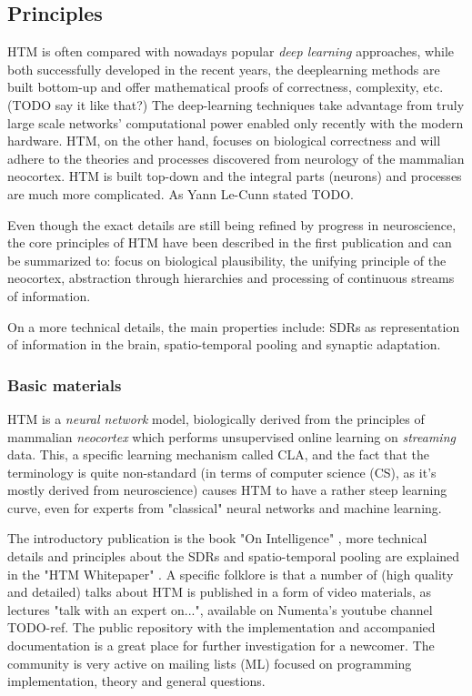 \documentclass[a4,IEEEconf]{article}
\begin{document}
\subsection{Principles}
HTM is often compared with nowadays popular \textit{deep learning} approaches, while both successfully developed in the recent years, the deeplearning methods are built bottom-up and offer mathematical proofs of correctness, complexity, etc.  (TODO say it like that?) The deep-learning techniques take advantage from truly large scale networks' computational power enabled only recently with the modern hardware. HTM, on the other hand, focuses on biological correctness and will adhere to the theories and processes discovered from neurology of the mammalian neocortex. HTM is built top-down and the integral parts (neurons) and processes are much more complicated. As Yann Le-Cunn stated TODO. 

Even though the exact details are still being refined by progress in neuroscience, the core principles of HTM have been described in the first publication \cite{hawkins04} and can be summarized to: focus on biological plausibility, the unifying principle of the neocortex, abstraction through hierarchies and processing of continuous streams of information. 

On a more technical details, the main properties include: SDRs as representation of information in the brain, spatio-temporal pooling and synaptic adaptation. 

\subsubsection{Basic materials}
HTM is a \textit{neural network} model, biologically derived from the principles of mammalian \textit{neocortex} which performs unsupervised online learning on \textit{streaming} data. This, a specific learning mechanism called CLA, and the fact that the terminology is quite non-standard (in terms of computer science (CS), as it's mostly derived from neuroscience) causes HTM to have a rather steep learning curve, even for experts from "classical" neural networks and machine learning. 

The introductory publication is the book "On Intelligence" \cite{hawkins04}, more technical details and principles about the SDRs and spatio-temporal pooling are explained in the "HTM Whitepaper" \cite{Hawkins:2010}. A specific folklore is that a number of (high quality and detailed) talks about HTM is published in a form of video materials, as lectures "talk with an expert on...", available on Numenta's youtube channel TODO-ref. The public repository with the implementation and accompanied documentation is a great place for further investigation for a newcomer. The community is very active on mailing lists (ML) focused on programming implementation, theory and general questions. 
  
\end{document}
